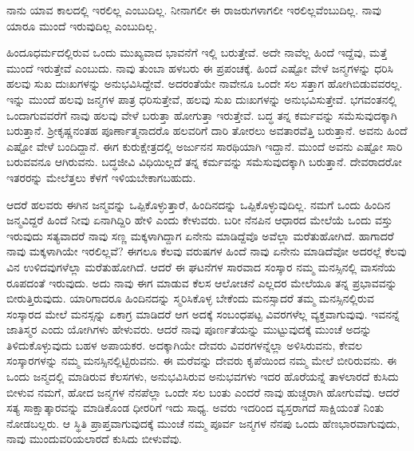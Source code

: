 \begin{artha}
ನಾನು ಯಾವ ಕಾಲದಲ್ಲಿ ಇರಲಿಲ್ಲ ಎಂಬುದಿಲ್ಲ. ನೀನಾಗಲೀ ಈ ರಾಜರುಗಳಾಗಲೀ ಇರ\-ಲಿಲ್ಲವೆಂಬುದಿಲ್ಲ. ನಾವು ಯಾರೂ ಮುಂದೆ ಇರುವುದಿಲ್ಲ ಎಂಬುದಿಲ್ಲ.
\end{artha}

ಹಿಂದೂಧರ್ಮದಲ್ಲಿರುವ ಒಂದು ಮುಖ್ಯವಾದ ಭಾವನೆಗೆ ಇಲ್ಲಿ ಬರುತ್ತೇವೆ. ಅದೇ ನಾವೆಲ್ಲ ಹಿಂದೆ ಇದ್ದೆವು, ಮತ್ತೆ ಮುಂದೆ ಇರುತ್ತೇವೆ ಎಂಬುದು. ನಾವು ತುಂಬಾ ಹಳಬರು ಈ ಪ್ರಪಂಚಕ್ಕೆ. ಹಿಂದೆ ಎಷ್ಟೋ ವೇಳೆ ಜನ್ಮಗಳನ್ನು ಧರಿಸಿ ಹಲವು ಸುಖ ದುಃಖಗಳನ್ನು ಅನುಭವಿಸಿದ್ದೇವೆ. ಅದರಂತೆಯೇ ನಾವೇನೂ ಒಂದೇ ಸಲ ಸತ್ತಾಗ ಹೋಗಿಬಿಡುವವರಲ್ಲ. ಇನ್ನು ಮುಂದೆ ಹಲವು ಜನ್ಮಗಳ ಪಾತ್ರ ಧರಿಸುತ್ತೇವೆ, ಹಲವು ಸುಖ ದುಃಖಗಳನ್ನು ಅನುಭವಿಸುತ್ತೇವೆ. ಭಗವಂತನಲ್ಲಿ ಒಂದಾಗುವವರೆಗೆ ನಾವು ಹಲವು ವೇಳೆ ಬರುತ್ತಾ ಹೋಗುತ್ತಾ ಇರುತ್ತೇವೆ. ಬದ್ಧ ತನ್ನ ಕರ್ಮವನ್ನು ಸಮೆಸುವುದಕ್ಕಾಗಿ ಬರುತ್ತಾನೆ. ಶ‍್ರೀಕೃಷ್ಣನಂತಹ ಪೂರ್ಣಾತ್ಮನಾದರೊ ಹಲವರಿಗೆ ದಾರಿ ತೋರಲು ಅವತಾರವೆತ್ತಿ ಬರುತ್ತಾನೆ. ಅವನು ಹಿಂದೆ ಎಷ್ಟೋ ವೇಳೆ ಬಂದಿದ್ದಾನೆ. ಈಗ ಕುರುಕ್ಷೇತ್ರದಲ್ಲಿ ಅರ್ಜುನನ ಸಾರಥಿಯಾಗಿ ಇದ್ದಾನೆ. ಮುಂದೆ ಅವನು ಎಷ್ಟೋ ಸಾರಿ ಬರುವವನೂ ಆಗಿರುವನು. ಬದ್ಧಜೀವಿ ವಿಧಿಯಿಲ್ಲದೆ ತನ್ನ ಕರ್ಮವನ್ನು ಸಮೆಸುವುದಕ್ಕಾಗಿ ಬರುತ್ತಾನೆ. ದೇವರಾದರೋ ಇತರರನ್ನು ಮೇಲೆತ್ತಲು ಕೆಳಗೆ ಇಳಿಯಬೇಕಾಗಬಹುದು.

ಆದರೆ ಹಲವರು ಈಗಿನ ಜನ್ಮವನ್ನು ಒಪ್ಪಿಕೊಳ್ಳುತ್ತಾರೆ, ಹಿಂದಿನದನ್ನು ಒಪ್ಪಿಕೊಳ್ಳುವುದಿಲ್ಲ. ನಮಗೆ ಒಂದು ಹಿಂದಿನ ಜನ್ಮವಿದ್ದರೆ ಹಿಂದೆ ನೀವು ಏನಾಗಿದ್ದಿರಿ ಹೇಳಿ ಎಂದು ಕೇಳುವರು. ಬರೀ ನೆನಪಿನ ಆಧಾರದ ಮೇಲೆಯೆ ಒಂದು ವಸ್ತು ಇರುವುದು ಸತ್ಯವಾದರೆ ನಾವು ಸಣ್ಣ ಮಕ್ಕಳಾಗಿದ್ದಾಗ ಏನೇನು ಮಾಡಿದ್ದೆವೊ ಅವೆಲ್ಲಾ ಮರೆತುಹೋಗಿದೆ. ಹಾಗಾದರೆ ನಾವು ಮಕ್ಕಳಾಗಿಯೇ ಇರಲಿಲ್ಲವೆ? ಈಗಲೂ ಕೆಲವು ವರುಷಗಳ ಹಿಂದೆ ನಾವು ಏನೇನು ಮಾಡಿದೆವೋ ಅದರಲ್ಲೆ ಕೆಲವು ವಿನ ಉಳಿದವುಗಳೆಲ್ಲಾ ಮರೆತುಹೋಗಿದೆ. ಆದರೆ ಈ ಘಟನೆಗಳ ಸಾರವಾದ ಸಂಸ್ಕಾರ ನಮ್ಮ ಮನಸ್ಸಿನಲ್ಲಿ ವಾಸನೆಯ ರೂಪದಂತೆ ಇರುವುದು. ಅದು ನಾವು ಈಗ ಮಾಡುವ ಕೆಲಸ ಆಲೋಚನೆ ಎಲ್ಲದರ ಮೇಲೆಯೂ ತನ್ನ ಪ್ರಭಾವವನ್ನು ಬೀರುತ್ತಿರುವುದು. ಯಾರಿಗಾದರೂ ಹಿಂದಿನದನ್ನು ಸ್ಮರಿಸಿಕೊಳ್ಳ ಬೇಕೆಂದು ಮನಸ್ಸಾದರೆ ತಮ್ಮ ಮನಸ್ಸಿನಲ್ಲಿರುವ ಸಂಸ್ಕಾರದ ಮೇಲೆ ಮನಸ್ಸನ್ನು ಏಕಾಗ್ರ ಮಾಡಿದರೆ ಆಗ ಅದಕ್ಕೆ ಸಂಬಂಧಪಟ್ಟ ವಿವರಗಳೆಲ್ಲ ವ್ಯಕ್ತವಾಗುವುವು. ಇವನನ್ನೆ ಜಾತಿಸ್ಮರ ಎಂದು ಯೋಗಿಗಳು ಹೇಳುವರು. ಆದರೆ ನಾವು ಪೂರ್ಣತೆಯನ್ನು ಮುಟ್ಟುವುದಕ್ಕೆ ಮುಂಚೆ ಅದನ್ನು ತಿಳಿದುಕೊಳ್ಳುವುದು ಬಹಳ ಅಪಾಯಕರ. ಅದಕ್ಕಾಗಿಯೇ ದೇವರು ವಿವರಗಳನ್ನೆಲ್ಲಾ ಅಳಿಸಿರುವನು, ಕೇವಲ ಸಂಸ್ಕಾರಗಳನ್ನು ನಮ್ಮ ಮನಸ್ಸಿನಲ್ಲಿಟ್ಟಿರುವನು. ಈ ಮರೆವನ್ನು ದೇವರು ಕೃಪೆಯಿಂದ ನಮ್ಮ ಮೇಲೆ ಬೀರಿರುವನು. ಈ ಒಂದು ಜನ್ಮದಲ್ಲಿ ಮಾಡಿರುವ ಕೆಲಸಗಳು, ಅನುಭವಿಸಿರುವ ಅನುಭವಗಳು ಇದರ ಹೊರೆಯನ್ನೆ ತಾಳಲಾರದೆ ಕುಸಿದು ಬೀಳುವ ನಮಗೆ, ಹೋದ ಜನ್ಮಗಳ ನೆನಪೆಲ್ಲಾ ಒಂದೇ ಸಲ ಬಂತು ಎಂದರೆ ನಾವು ಹುಚ್ಚರಾಗಿ ಹೋಗುವೆವು. ಆದರೆ ಸತ್ಯ ಸಾಕ್ಷಾತ್ಕಾರವನ್ನು ಮಾಡಿಕೊಂಡ ಧೀರರಿಗೆ ಇದು ಸಾಧ್ಯ. ಅವರು ಇದರಿಂದ ವ್ಯಸ್ತರಾಗದೆ ಸಾಕ್ಷಿಯಂತೆ ನಿಂತು ನೋಡಬಲ್ಲರು. ಆ ಸ್ಥಿತಿ ಪ್ರಾಪ್ತವಾಗುವುದಕ್ಕೆ ಮುಂಚೆ ನಮ್ಮ ಪೂರ್ವ ಜನ್ಮಗಳ ನೆನಪು ಒಂದು ಹೆಣಭಾರವಾಗುವುದು, ನಾವು ಮುಂದುವರಿಯಲಾರದೆ ಕುಸಿದು ಬೀಳುವೆವು. 

